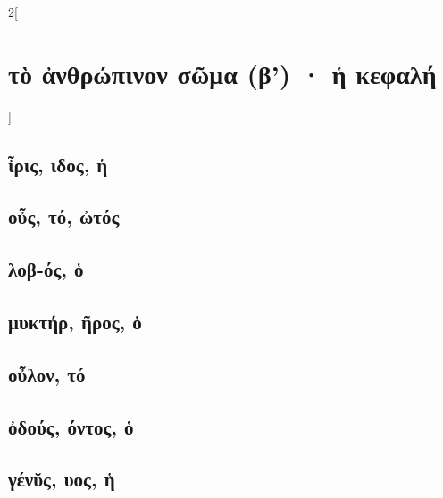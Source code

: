 \documentclass{book}
\begin{document}
\begin{multicols}{2}[\section{τὸ ἀνθρώπινον σῶμα (β') · ἡ κεφαλή}]
\subsection{ἶρις, ιδος, ἡ}
\subsection{οὖς, τό, ὠτός}
\subsection{λοβ-ός, ὁ}
\subsection{μυκτήρ, ῆρος, ὁ}
\subsection{οὖλον, τό}
\subsection{ὀδούς, όντος, ὁ}
\subsection{γένῠς, υος, ἡ}        

~
\end{multicols}
\newpage
\end{document}
